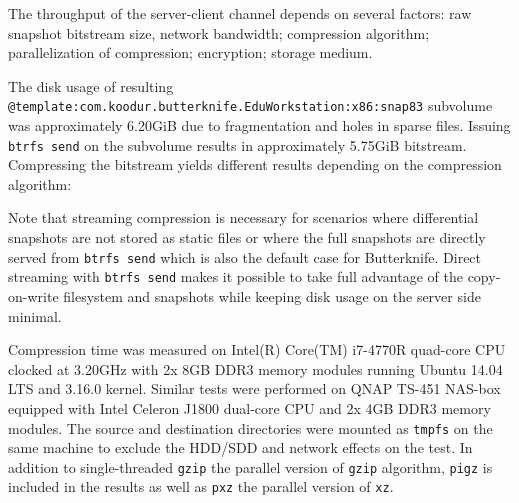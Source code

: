 \documentclass[a4paper,11pt]{kth-mag}
\begin{document}
The throughput of the server-client channel depends on
several factors: 
raw snapshot bitstream size,
network bandwidth;
compression algorithm;
parallelization of compression;
encryption;
storage medium.

The disk usage of resulting
\texttt{@template:com.koodur.butterknife.EduWorkstation:x86:snap83}
subvolume was approximately 6.20GiB
due to fragmentation and holes in sparse files.
Issuing \texttt{btrfs send} on the subvolume
results in approximately 5.75GiB bitstream.
Compressing the bitstream yields different
results depending on the compression algorithm:\\


Note that streaming compression is necessary for scenarios
where differential snapshots are not stored as static files
or where the full snapshots are directly served from
\texttt{btrfs send} which is also the default case for Butterknife.
Direct streaming with \texttt{btrfs send} makes it possible
to take full advantage of the copy-on-write filesystem
and snapshots while keeping disk usage on the server side minimal.

Compression time was measured on Intel(R) Core(TM) i7-4770R quad-core CPU 
clocked at 3.20GHz with 2x 8GB DDR3 memory modules running
Ubuntu 14.04 LTS and 3.16.0 kernel.
Similar tests were performed on QNAP TS-451 NAS-box equipped with
Intel Celeron J1800 dual-core CPU and 2x 4GB DDR3 memory modules.
The source and destination directories were
mounted as \texttt{tmpfs} on the same 
machine to exclude the
HDD/SDD and network effects on the test.
In addition to single-threaded \texttt{gzip}
the parallel version of \texttt{gzip} algorithm,
\texttt{pigz} is included in the results as well as \texttt{pxz}
the parallel version of \texttt{xz}.
\\

\end{document}
